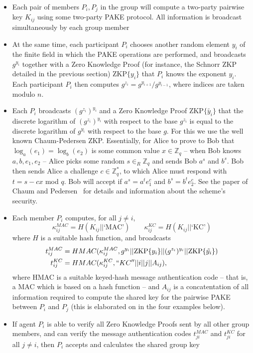 \begin{itemize} \itemsep=1.2em
\item Each pair of members $P_i,P_j$ in the group will compute a two-party pairwise key $K_{ij}$ using some two-party PAKE protocol.  All information is broadcast simultaneously by each group member
\item At the same time, each participant $P_i$ chooses another random element $y_i$ of the finite field in which the PAKE operations are performed, and broadcasts $g^{y_i}$ together with a Zero Knowledge Proof (for instance, the Schnorr ZKP detailed in the previous section) ZKP$\{y_i\}$ that $P_i$ knows the exponent $y_i$.  Each participant $P_i$ then computes $g^{z_i} = g^{y_{i+1}}/g^{y_{i-1}}$, where indices are taken modulo $n$.
\item  Each $P_i$ broadcasts $(g^{z_i})^{y_i}$ and a Zero Knowledge Proof ZKP$\{\tilde{y_i}\}$ that the discrete logarithm of $(g^{z_i})^{y_i}$ with respect to the base $g^{z_i}$ is equal to the discrete logarithm of $g^{y_i}$ with respect to the base $g$. For this we use the well known Chaum-Pedersen ZKP. Essentially, for Alice to prove to Bob that $\log_a(e_1) = \log_b(e_2)$ is some common value $x \in \mathbb{Z}_q$ -- when Bob knows $a,b,e_1,e_2$ -- Alice picks some random $s \in_R \mathbb{Z}_q$ and sends Bob $a^s$ and $b^s$.  Bob then sends Alice a challenge $c \in \mathbb{Z}_q^*$, to which Alice must respond with $t = s-cx$ mod $q$.  Bob will accept if $a^s = a^t e_1^{c}$ and $b^s = b^t e_2^{c}$.  See the paper of Chaum and Pedersen~\cite{ChPe92} for details and information about the scheme's security.
\item Each member $P_i$ computes, for all $j \neq i$,
\[ \kappa_{ij}^{MAC} = H(K_{ij} || \text{`MAC'}) \qquad \kappa_{ij}^{KC} = H(K_{ij} || \text{`KC'}) \] 
where $H$ is a suitable hash function, and broadcasts
\begin{align*}
t_{ij}^{MAC} &= HMAC(\kappa_{ij}^{MAC},  g^{y_i} || \text{ZKP}\{y_i\} || (g^{z_i})^{y_i} || \text{ZKP}\{\tilde{y_i}\})\\
        t_{ij}^{KC} &= HMAC(\kappa_{ij}^{KC}, ``KC''|| i || j || A_{ij}),
\end{align*}
where HMAC is a suitable keyed-hash message authentication code -- that is, a MAC which is based on a hash function -- and $A_{ij}$ is a concatentation of all information required to compute the shared key for the pairwise PAKE between $P_i$ and $P_j$ (this is elaborated on in the four examples below).
\item If agent $P_i$ is able to verify all Zero Knowledge Proofs sent by all other group members, and can verify the message authentication codes $t_{ji}^{MAC}$ and $t_{ji}^{KC}$ for all $j \neq i$, then $P_i$ accepts and calculates the shared group key

\end{itemize}
